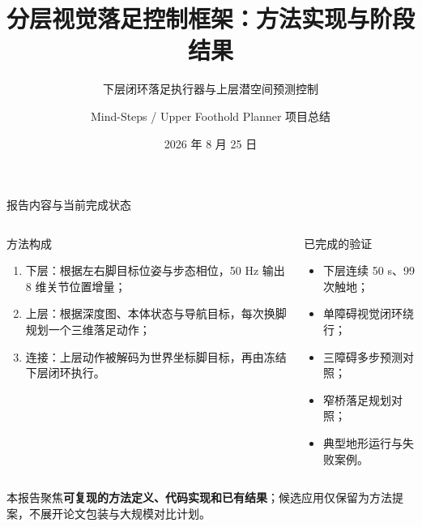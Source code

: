 \documentclass[aspectratio=169,10pt]{beamer}
\title[分层视觉落足控制]{分层视觉落足控制框架：方法实现与阶段结果}
\subtitle{下层闭环落足执行器与上层潜空间预测控制}
\author{Mind-Steps / Upper Foothold Planner 项目总结}
\date{2026 年 8 月 25 日}
\begin{document}
\begin{frame}
  \titlepage
\end{frame}

\begin{frame}{报告内容与当前完成状态}
\begin{columns}[T,onlytextwidth]
\begin{block}{方法构成}
\begin{enumerate}
  \item 下层：根据左右脚目标位姿与步态相位，50 Hz 输出 8 维关节位置增量；
  \item 上层：根据深度图、本体状态与导航目标，每次换脚规划一个三维落足动作；
  \item 连接：上层动作被解码为世界坐标脚目标，再由冻结下层闭环执行。
\end{enumerate}
\end{block}
\begin{block}{已完成的验证}
\begin{itemize}
  \item 下层连续 50 s、99 次触地；
  \item 单障碍视觉闭环绕行；
  \item 三障碍多步预测对照；
  \item 窄桥落足规划对照；
  \item 典型地形运行与失败案例。
\end{itemize}
\end{block}
\end{columns}
\vspace{0.3em}
本报告聚焦\textbf{可复现的方法定义、代码实现和已有结果}；候选应用仅保留为方法提案，不展开论文包装与大规模对比计划。
\end{frame}
\end{document}
